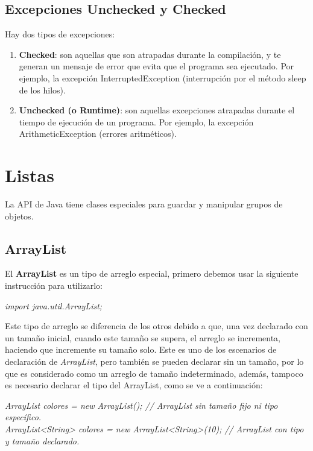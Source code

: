 \subsection{Excepciones Unchecked y Checked}
\hspace{0.55cm}Hay dos tipos de excepciones:
\begin{enumerate}
    \item \textbf{Checked}: son aquellas que son atrapadas durante la compilación, y te generan un mensaje de error que evita que el programa sea ejecutado. Por ejemplo, la excepción InterruptedException (interrupción por el método sleep de los hilos).
    \item \textbf{Unchecked (o Runtime)}: son aquellas excepciones atrapadas durante el tiempo de ejecución de un programa. Por ejemplo, la excepción ArithmeticException (errores aritméticos).
\end{enumerate}



\section{Listas}
\hspace{0.55cm}La API de Java tiene clases especiales para guardar y manipular grupos de objetos.


\subsection{ArrayList}
\hspace{0.55cm}El \textbf{ArrayList} es un tipo de arreglo especial, primero debemos usar la siguiente instrucción para utilizarlo:
\begin{center}
    \textit{import java.util.ArrayList;}
\end{center}

Este tipo de arreglo se diferencia de los otros debido a que, una vez declarado con un tamaño inicial, cuando este tamaño se supera, el arreglo se incrementa, haciendo que incremente su tamaño solo. Este es uno de los escenarios de declaración de \textit{ArrayList}, pero también se pueden declarar sin un tamaño, por lo que es considerado como un arreglo de tamaño indeterminado, además, tampoco es necesario declarar el tipo del ArrayList, como se ve a continuación:
\begin{center}
    \textit{
        ArrayList colores = new ArrayList(); // ArrayList sin tamaño fijo ni tipo específico. \\
        ArrayList<String> colores = new ArrayList<String>(10); // ArrayList con tipo y tamaño declarado.
    }
\end{center}

